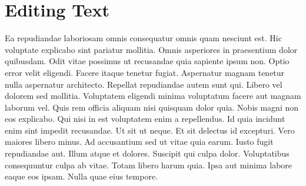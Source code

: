 
\chapter*{Editing Text}

Ea repudiandae laboriosam omnis consequatur omnis quam nesciunt est. Hic
voluptate explicabo sint pariatur mollitia. Omnis asperiores in praesentium
dolor quibusdam. Odit vitae possimus ut recusandae quia sapiente ipsum non.
Optio error velit eligendi. Facere itaque tenetur fugiat. Aspernatur magnam
tenetur nulla aspernatur architecto. Repellat repudiandae autem sunt qui.
Libero vel dolorem sed mollitia. Voluptatem eligendi minima voluptatum facere
aut magnam laborum vel. Quis rem officia aliquam nisi quisquam dolor quia.
Nobis magni non eos explicabo. Qui nisi in est voluptatem enim a repellendus.
Id quia incidunt enim sint impedit recusandae. Ut sit ut neque. Et sit delectus
id excepturi. Vero maiores libero minus. Ad accusantium sed ut vitae quia
earum. Iusto fugit repudiandae aut. Illum atque et dolores. Suscipit qui culpa
dolor. Voluptatibus consequuntur culpa ab vitae. Totam libero harum quia. Ipsa
aut minima labore eaque eos ipsam. Nulla quae eius tempore.

\@openrighttrue\makeatother
